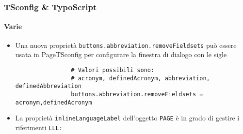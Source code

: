 \begin{frame}[fragile]
	\frametitle{TSconfig \& TypoScript}
	\framesubtitle{Varie}

	\begin{itemize}
		\item Una nuova proprietà \texttt{buttons.abbreviation.removeFieldsets} può essere usata in
			PageTSconfig per configurare la finestra di dialogo con le sigle

			\begin{lstlisting}
				# Valori possibili sono:
				# acronym, definedAcronym, abbreviation, definedAbbreviation
				buttons.abbreviation.removeFieldsets = acronym,definedAcronym
			\end{lstlisting}

		\item La proprietà \texttt{inlineLanguageLabel} dell'oggetto \texttt{PAGE} è in grado\newline
			di gestire i riferimenti \texttt{LLL:}

	\end{itemize}

\end{frame}

